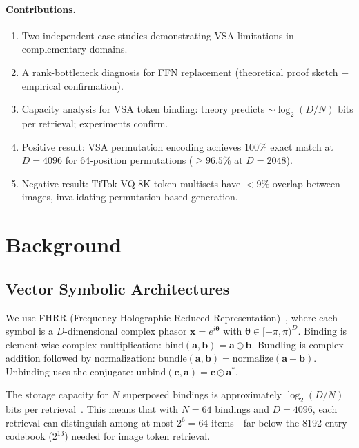 \documentclass{article}
\begin{document}
\paragraph{Contributions.}
\begin{enumerate}[leftmargin=*]
\item Two independent case studies demonstrating VSA limitations in complementary domains.
\item A rank-bottleneck diagnosis for FFN replacement (theoretical proof sketch + empirical confirmation).
\item Capacity analysis for VSA token binding: theory predicts ${\sim}\log_2(D/N)$ bits per retrieval; experiments confirm.
\item Positive result: VSA permutation encoding achieves 100\% exact match at $D{=}4096$ for 64-position permutations (${\ge}96.5\%$ at $D{=}2048$).
\item Negative result: TiTok VQ-8K token multisets have ${<}9\%$ overlap between images, invalidating permutation-based generation.
\end{enumerate}

\section{Background}
\label{sec:background}

\subsection{Vector Symbolic Architectures}

We use FHRR (Frequency Holographic Reduced Representation)~\citep{plate2003holographic}, where each symbol is a $D$-dimensional complex phasor $\mathbf{x} = e^{i\boldsymbol{\theta}}$ with $\boldsymbol{\theta} \in [-\pi, \pi)^D$.
Binding is element-wise complex multiplication: $\text{bind}(\mathbf{a}, \mathbf{b}) = \mathbf{a} \odot \mathbf{b}$.
Bundling is complex addition followed by normalization: $\text{bundle}(\mathbf{a}, \mathbf{b}) = \text{normalize}(\mathbf{a} + \mathbf{b})$.
Unbinding uses the conjugate: $\text{unbind}(\mathbf{c}, \mathbf{a}) = \mathbf{c} \odot \mathbf{a}^*$.

The storage capacity for $N$ superposed bindings is approximately $\log_2(D/N)$ bits per retrieval~\citep{frady2018theory}.
This means that with $N{=}64$ bindings and $D{=}4096$, each retrieval can distinguish among at most $2^6 = 64$ items---far below the 8192-entry codebook ($2^{13}$) needed for image token retrieval.
\end{document}
